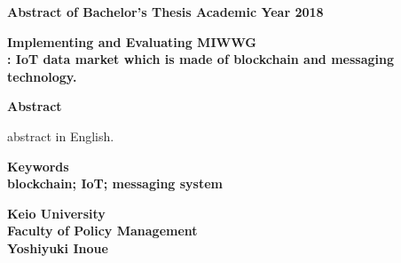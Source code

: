 \begin{center}
\textbf{\large Abstract of Bachelor's Thesis Academic Year 2018}

\vspace{6mm}

\textbf{\large Implementing and Evaluating MIWWG \\ : IoT data market which is made of blockchain and messaging technology.}
\end{center}

\vspace{10mm}


\begin{flushleft}
\textbf{Abstract}\\
\end{flushleft}

abstract in English.

\begin{flushleft}
\textbf{Keywords}\\
\textbf{blockchain; IoT; messaging system}
\end{flushleft}

\begin{flushright}
\textbf{Keio University \\ Faculty of Policy Management}\\
\textbf{Yoshiyuki Inoue}\\
\end{flushright}
\newpage